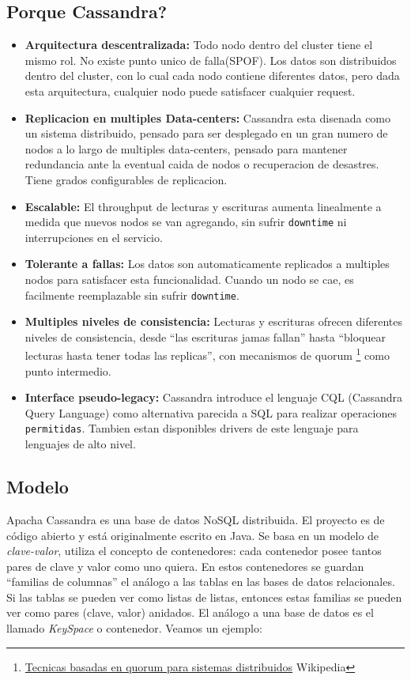 \documentclass[11pt,a4paper]{article}
\begin{document}
\subsection{Porque Cassandra?}
\begin{itemize}
  \item \textbf{Arquitectura descentralizada: } Todo nodo dentro del cluster tiene el mismo rol. No existe punto unico de falla(SPOF). Los datos son distribuidos dentro del cluster, con lo cual cada nodo contiene diferentes datos, pero dada esta arquitectura, cualquier nodo puede satisfacer cualquier request.


  \item \textbf{Replicacion en multiples Data-centers: } Cassandra esta disenada como un sistema distribuido, pensado para ser desplegado en un gran numero de nodos a lo largo de multiples data-centers, pensado para mantener redundancia ante la eventual caida de nodos o recuperacion de desastres. Tiene grados configurables de replicacion.

  \item \textbf{Escalable: } El throughput de lecturas y escrituras aumenta linealmente a medida que nuevos nodos se van agregando, sin sufrir \texttt{downtime} ni interrupciones en el servicio. 

  \item \textbf{Tolerante a fallas: } Los datos son automaticamente replicados a multiples nodos para satisfacer esta funcionalidad. Cuando un nodo se cae, es facilmente reemplazable sin sufrir \texttt{downtime}.

  \item \textbf{Multiples niveles de consistencia: } Lecturas y escrituras ofrecen diferentes niveles de consistencia, desde ``las escrituras jamas fallan'' hasta ``bloquear lecturas hasta tener todas las replicas'', con mecanismos de quorum \footnote{ \href{https://en.wikipedia.org/wiki/Quorum_(distributed_computing)}{Tecnicas basadas en quorum para sistemas distribuidos} Wikipedia} como punto intermedio.

  \item \textbf{Interface pseudo-legacy: } Cassandra introduce el lenguaje CQL (Cassandra Query Language) como alternativa parecida a SQL para realizar operaciones \texttt{permitidas}. Tambien estan disponibles drivers de este lenguaje para lenguajes de alto nivel. 
\end{itemize}

\subsection{Modelo}
Apacha Cassandra es una base de datos NoSQL distribuida. El proyecto es de código abierto y está originalmente escrito en Java. Se basa en un modelo de \textit{clave-valor}, utiliza el concepto de contenedores: cada contenedor posee tantos pares de clave y valor como uno quiera. En estos contenedores se guardan ``familias de columnas'' el análogo a las tablas en las bases de datos relacionales. Si las tablas se pueden ver como listas de listas, entonces estas familias se pueden ver como pares (clave, valor) anidados. El análogo a una base de datos es el llamado \textit{KeySpace} o contenedor. Veamos un ejemplo:
\end{document}
